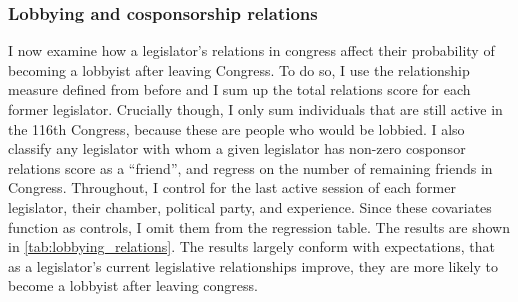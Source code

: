 \documentclass{article}
\begin{document}
  \subsubsection{Lobbying and cosponsorship relations}
  \label{result:lobbying_relations}
  I now examine how a legislator's relations in congress affect their probability of becoming a lobbyist after leaving Congress. To do so, I use the relationship measure defined from before and I sum up the total relations score for each former legislator. Crucially though, I only sum individuals that are still active in the 116th Congress, because these are people who would be lobbied. I also classify any legislator with whom a given legislator has non-zero cosponsor relations score as a ``friend'', and regress on the number of remaining friends in Congress. Throughout, I control for the last active session of each former legislator, their chamber, political party, and experience. Since these covariates function as controls, I omit them from the regression table. The results are shown in \ref{tab:lobbying_relations}. The results largely conform with expectations, that as a legislator's current legislative relationships improve, they are more likely to become a lobbyist after leaving congress. 
\end{document}
